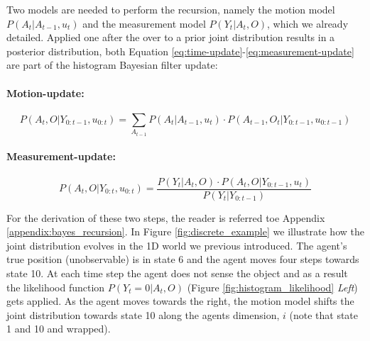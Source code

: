 Two models are needed to perform the recursion, namely the motion model $P(A_t|A_{t-1},u_t)$ and the measurement model
$P(Y_t|A_t,O)$, which we already detailed. Applied one after the over to a prior joint distribution results in a posterior
distribution, both Equation \ref{eq:time-update}-\ref{eq:measurement-update} are part of the histogram Bayesian filter 
update:

\paragraph{Motion-update:}
\begin{equation}\label{eq:time-update}
   P(A_t,O|Y_{0:t-1},u_{0:t}) = \sum_{A_{t-1}} P(A_t|A_{t-1},u_t) \cdot  P(A_{t-1},O_t|Y_{0:t-1},u_{0:t-1})
\end{equation}
\paragraph{Measurement-update:}
\begin{equation}\label{eq:measurement-update}
   P(A_t,O|Y_{0:t},u_{0:t}) = \frac{P(Y_t|A_t,O)\cdot P(A_t,O|Y_{0:t-1},u_{t}) }{P(Y_t|Y_{0:t-1})}
\end{equation}

For the derivation of these  two steps, the reader is referred toe Appendix \ref{appendix:bayes_recursion}.
In Figure \ref{fig:discrete_example} we illustrate how the joint distribution evolves in the 1D world 
we previous introduced. The agent's true position (unobservable) is in state 6 and the agent moves four steps towards state 10. At each time 
step the agent does not sense the object and as a result the likelihood function  $P(Y_t=0|A_t,O)$ (Figure \ref{fig:histogram_likelihood} \textit{Left})
gets applied. As the agent moves towards the right, the motion model shifts the joint distribution towards state 10 along the agents 
dimension, $i$ (note that state 1 and 10 and wrapped).

